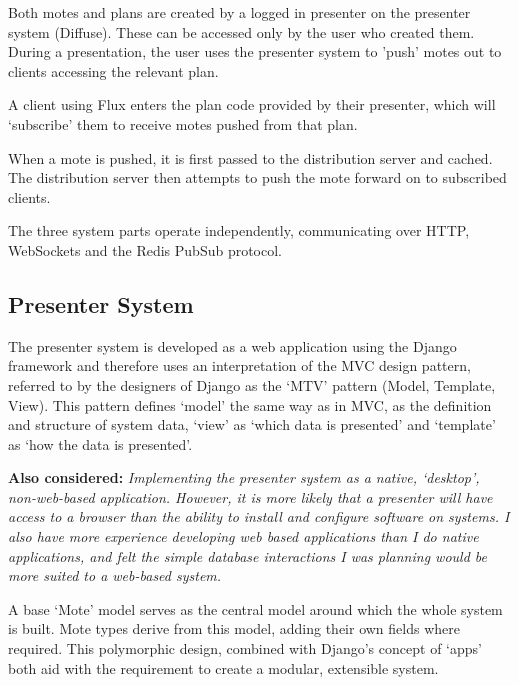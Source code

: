 \documentclass[a4papert,11pt,notitlepage]{ltxdoc}
\begin{document}
Both motes and plans are created by a logged in presenter on the presenter system (Diffuse). These can be accessed only by the user who created them. During a presentation, the user uses the presenter system to 'push' motes out to clients accessing the relevant plan.

A client using Flux enters the plan code provided by their presenter, which will `subscribe' them to receive motes pushed from that plan.

When a mote is pushed, it is first passed to the distribution server and cached. The distribution server then attempts to push the mote forward on to subscribed clients.

The three system parts operate independently, communicating over HTTP, WebSockets and the Redis PubSub protocol.


\subsection{Presenter System}
The presenter system is developed as a web application using the Django framework and therefore uses an interpretation of the MVC design pattern, referred to by the designers of Django as the `MTV' pattern (Model, Template, View). This pattern defines `model' the same way as in MVC, as the definition and structure of system data, `view' as `which data is presented' and `template' as `how the data is presented'\cite{djangomvcfaq:web}.

\textbf{Also considered:} \emph{Implementing the presenter system as a native, `desktop', non-web-based application. However, it is more likely that a presenter will have access to a browser than the ability to install and configure software on systems. I also have more experience developing web based applications than I do native applications, and felt the simple database interactions I was planning would be more suited to a web-based system.}

A base `Mote' model serves as the central model around which the whole system is built. Mote types derive from this model, adding their own fields where required. This polymorphic design, combined with Django's concept of `apps' both aid with the requirement to create a modular, extensible system.
\end{document}

